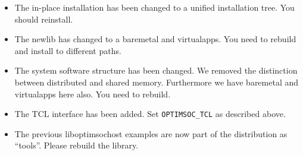 \begin{itemize}
\item The in-place installation has been changed to a unified
  installation tree. You should reinstall.
\item The newlib has changed to a baremetal and virtualapps. You need
  to rebuild and install to different paths.
\item The system software structure has been changed. We removed the
  distinction between distributed and shared memory. Furthermore we
  have baremetal and virtualapps here also. You need to rebuild.
\item The TCL interface has been added. Set \verb|OPTIMSOC_TCL| as
  described above.
\item The previous liboptimsochost examples are now part of the
  distribution as ``tools''. Please rebuild the library.
\end{itemize}